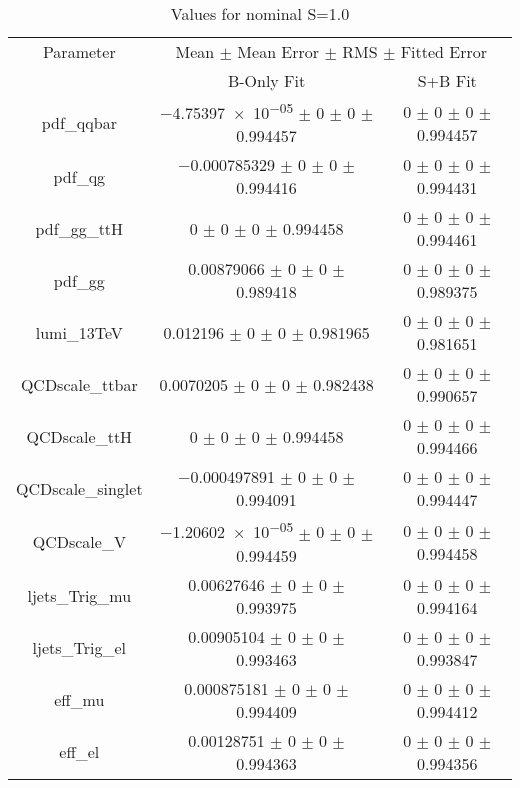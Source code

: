 \begin{table}
\centering
\caption{Values for nominal S=1.0}
\begin{tabular}{ccc}
\toprule
Parameter & \multicolumn{2}{c}{Mean $\pm$ Mean Error $\pm$ RMS $\pm$ Fitted Error}\\
 & B-Only Fit & S+B Fit\\
\midrule
pdf\_qqbar & \num{-4.75397e-05} $\pm$ \num{0} $\pm$ \num{0} $\pm$ \num{0.994457} & \num{0} $\pm$ \num{0} $\pm$ \num{0} $\pm$ \num{0.994457}\\
pdf\_qg & \num{-0.000785329} $\pm$ \num{0} $\pm$ \num{0} $\pm$ \num{0.994416} & \num{0} $\pm$ \num{0} $\pm$ \num{0} $\pm$ \num{0.994431}\\
pdf\_gg\_ttH & \num{0} $\pm$ \num{0} $\pm$ \num{0} $\pm$ \num{0.994458} & \num{0} $\pm$ \num{0} $\pm$ \num{0} $\pm$ \num{0.994461}\\
pdf\_gg & \num{0.00879066} $\pm$ \num{0} $\pm$ \num{0} $\pm$ \num{0.989418} & \num{0} $\pm$ \num{0} $\pm$ \num{0} $\pm$ \num{0.989375}\\
lumi\_13TeV & \num{0.012196} $\pm$ \num{0} $\pm$ \num{0} $\pm$ \num{0.981965} & \num{0} $\pm$ \num{0} $\pm$ \num{0} $\pm$ \num{0.981651}\\
QCDscale\_ttbar & \num{0.0070205} $\pm$ \num{0} $\pm$ \num{0} $\pm$ \num{0.982438} & \num{0} $\pm$ \num{0} $\pm$ \num{0} $\pm$ \num{0.990657}\\
QCDscale\_ttH & \num{0} $\pm$ \num{0} $\pm$ \num{0} $\pm$ \num{0.994458} & \num{0} $\pm$ \num{0} $\pm$ \num{0} $\pm$ \num{0.994466}\\
QCDscale\_singlet & \num{-0.000497891} $\pm$ \num{0} $\pm$ \num{0} $\pm$ \num{0.994091} & \num{0} $\pm$ \num{0} $\pm$ \num{0} $\pm$ \num{0.994447}\\
QCDscale\_V & \num{-1.20602e-05} $\pm$ \num{0} $\pm$ \num{0} $\pm$ \num{0.994459} & \num{0} $\pm$ \num{0} $\pm$ \num{0} $\pm$ \num{0.994458}\\
ljets\_Trig\_mu & \num{0.00627646} $\pm$ \num{0} $\pm$ \num{0} $\pm$ \num{0.993975} & \num{0} $\pm$ \num{0} $\pm$ \num{0} $\pm$ \num{0.994164}\\
ljets\_Trig\_el & \num{0.00905104} $\pm$ \num{0} $\pm$ \num{0} $\pm$ \num{0.993463} & \num{0} $\pm$ \num{0} $\pm$ \num{0} $\pm$ \num{0.993847}\\
eff\_mu & \num{0.000875181} $\pm$ \num{0} $\pm$ \num{0} $\pm$ \num{0.994409} & \num{0} $\pm$ \num{0} $\pm$ \num{0} $\pm$ \num{0.994412}\\
eff\_el & \num{0.00128751} $\pm$ \num{0} $\pm$ \num{0} $\pm$ \num{0.994363} & \num{0} $\pm$ \num{0} $\pm$ \num{0} $\pm$ \num{0.994356}\\

\end{tabular}
\end{table}
